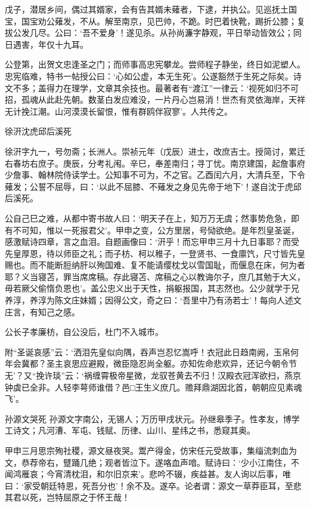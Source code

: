 \documentclass[]{article}
\begin{document}
戊子，潜居乡间，偶过其婿家，会有告其婿未薙者，下逮，并执公。见巡抚土国宝，国宝劝公薙发，不从。解至南京，见巴帅，不跪。时巴着快靴，踢折公膝；复拔公发几尽。公曰：`吾不爱身'！遂见杀。从孙尚濂字静观，平日举动皆效公；同日遇害，年仅十九耳。

公登第，出贺文忠逢圣之门；而师事高忠宪攀龙。尝师程子静坐，终日如泥塑人。忠宪临难，特书一帖授公曰：`心如公虚，本无生死'。公遂豁然于生死之际矣。诗文不多；盖得力在理学，文章其余技也。最著者有``渡江''一律云：`视死如归不可招，孤魂从此赴先朝。数茎白发应难没，一片丹心岂易消！世杰有灵依海岸，天祥无计挽江潮。山河漠漠长留恨，惟有群鸥伴寂寥'。人共传之。

徐汧沈虎邱后溪死

徐汧字九一，号勿斋；长洲人。崇祯元年（戊辰）进士，改庶吉士。授简讨，累迁右春坊右庶子。庚辰，分考礼闱。辛巳，奉差南归；寻丁忧。南京建国，起詹事府少詹事、翰林院侍读学士。公知事不可为，不之官。乙酉闰六月，大清兵至，下令薙发；公誓不屈辱，曰：`以此不屈膝、不薙发之身见先帝于地下'！遂自沈于虎邱后溪死。

公自己巳之难，从都中寄书故人曰：`明天子在上，知万万无虞；然事势危急，即有不可知，惟以一死报君父'。甲申之变，公方里居，号恸欲绝。是年烈皇圣诞，感激赋诗四章，言之血泪。自题画像曰：`汧乎！而忘甲申三月十九日事耶？而受先皇厚恩，待以师臣之礼；而子枋、柯以稚子，一登贤书、一食廪饩，尺寸皆先皇赐也。而不能断脰纳肝以殉国难、复不能请缨枕戈以雪国耻，而偃息在床，何为者耶？义当寝苫，罪当席席稿。存此寝苫、席稿之心以教诲尔子，庶几其勉于大义，毋若厥父偷惰负恩也'。盖公忠义出于天性，捐躯报国，其志然也。公少就学于兄养淳，养淳为陈文庄妹婿；因得公文，奇之曰：`吾里中乃有汤若士'！每向人述文庄言，有知己之感。

公长子孝廉枋，自公没后，杜门不入城市。

附``圣诞哀感''云：`洒泪先皇似向隅，吞声岂忍忆嵩呼！衣冠此日趋南阙，玉帛何年会冀都？圣主哀思应避殿，微臣隐忍尚全躯。亦知佐命悲欢异，还记今朝令节无'？又``挽许琰''云：`祸缠霄极帝星微，龙驭苍黄去不归！汉殿衣冠浑欲扫，燕京钟虡已全非。人轻李萼师谁借？邑□王生义庶几。赡拜鼎湖因北首，朝朝应见素魂飞'。

孙源文哭死
孙源文字南公，无锡人；万历甲戌状元。孙继皋季子。性孝友，博学工诗文；凡河漕、军屯、钱赋、历律、山川、星纬之书，悉窥其奥。

甲申三月思宗殉社稷，源文昼夜哭。鬻产得金，仿宋任元受故事，集缁流刺血为文，恭荐帝右，躄踊几绝；观者皆泣下。遂咯血声喑。赋诗曰：`少小江南住，不闻鸿雁哀；今宵清枕泪，和尔旧京来'。悲吟不辍，疾益甚。友人询以后事，唯曰：`家受朝廷特恩，死吾分也'！余不及。遂卒。论者谓：源文一草莽臣耳，至悲其君以死，岂特屈原之于怀王哉！
\end{document}
